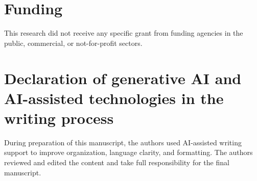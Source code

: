 \documentclass[preprint,12pt,number]{elsarticle}
\begin{document}
\section*{Funding}
This research did not receive any specific grant from funding agencies in the public, commercial, or not-for-profit sectors.

\section*{Declaration of generative AI and AI-assisted technologies in the writing process}
During preparation of this manuscript, the authors used AI-assisted writing support to improve organization, language clarity, and formatting. The authors reviewed and edited the content and take full responsibility for the final manuscript.



\end{document}
